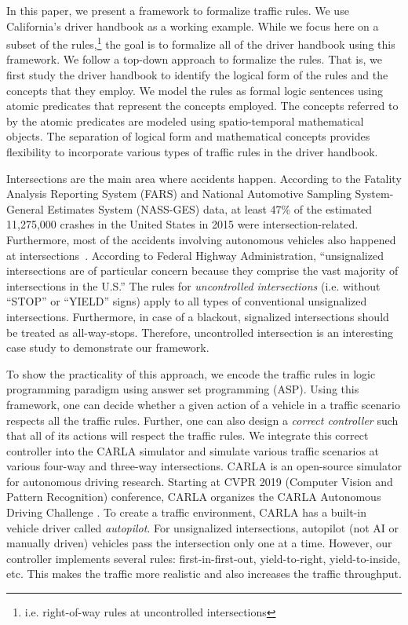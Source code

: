 In this paper,
we present a framework to formalize traffic rules.
We use California's driver handbook as a working example.
While we focus here on a subset of the rules,\footnote{i.e. right-of-way rules at uncontrolled intersections}
the goal is to formalize all of the driver handbook using this framework.
We follow a top-down approach to formalize the rules.
That is,
we first study the driver handbook to identify
the logical form of the rules and the concepts that they employ.
We model the rules as formal logic sentences
using atomic predicates that represent the concepts employed.
The concepts referred to by the atomic predicates
are modeled using spatio-temporal mathematical objects.
The separation of logical form and mathematical concepts
provides flexibility to incorporate various types of traffic rules in the driver handbook.

Intersections are the main area where accidents happen.
According to the Fatality Analysis Reporting System (FARS) and National Automotive Sampling System-General Estimates System (NASS-GES) data, at least 47\% of the estimated 11,275,000 crashes in the United States in 2015 \cite{DOT.2017} were intersection-related.
Furthermore,
most of the accidents involving autonomous vehicles also happened at intersections~\cite{CADMVdocumentation,NHTSA.2017}.
According to Federal Highway Administration, ``unsignalized intersections are of particular concern because they comprise the vast majority of intersections in the U.S.''\cite{FHWA-Unsignalized.2019}
The rules for \emph{uncontrolled intersections} (i.e. without ``STOP'' or ``YIELD'' signs)
apply to all types of conventional unsignalized intersections.
Furthermore,
in case of a blackout,
signalized intersections should be treated as all-way-stops.\cite{DMV-California.2019}
Therefore,
uncontrolled intersection is an interesting case study to demonstrate our framework.

To show the practicality of this approach, we encode the traffic rules in logic programming paradigm using answer set programming (ASP). 
Using this framework, one can decide whether a given action of a vehicle in a traffic scenario respects all the traffic rules.
Further, one can also design a \emph{correct controller} such that all of its actions will respect the traffic rules. 
We integrate this correct controller into the CARLA simulator and simulate various traffic scenarios at various four-way and three-way intersections.
CARLA \cite{Dosovitskiy.2017} is an open-source simulator for autonomous driving research.
Starting at CVPR 2019 (Computer Vision and Pattern Recognition) conference, CARLA organizes the CARLA Autonomous Driving Challenge \cite{CARLA-Challenge.2019}.
To create a traffic environment, CARLA has a built-in vehicle driver called \emph{autopilot}.
For unsignalized intersections,
autopilot (not AI or manually driven) vehicles
pass the intersection only one at a time.
However, our controller implements several rules:
first-in-first-out,
yield-to-right,
yield-to-inside, etc.
This makes the traffic more realistic and also increases the traffic throughput.

